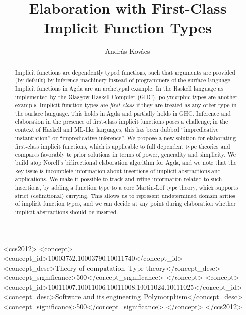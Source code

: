 \documentclass[acmsmall,screen,dvipsnames]{acmart}\settopmatter{}
\theoremstyle{remark}
\begin{document}
\title{Elaboration with First-Class Implicit Function Types}

\author{Andr{\'a}s Kov{\'a}cs}


\begin{abstract}
Implicit functions are dependently typed functions, such that arguments are
provided (by default) by inference machinery instead of programmers of the
surface language. Implicit functions in Agda are an archetypal example. In the
Haskell language as implemented by the Glasgow Haskell Compiler (GHC),
polymorphic types are another example. Implicit function types are
\emph{first-class} if they are treated as any other type in the surface
language. This holds in Agda and partially holds in GHC. Inference and
elaboration in the presence of first-class implicit functions poses a challenge;
in the context of Haskell and ML-like languages, this has been dubbed
``impredicative instantiation'' or ``impredicative inference''. We propose a new
solution for elaborating first-class implicit functions, which is applicable
to full dependent type theories and compares favorably to prior solutions in
terms of power, generality and simplicity. We build atop Norell's
bidirectional elaboration algorithm for Agda, and we note that the key issue is
incomplete information about insertions of implicit abstractions and
applications. We make it possible to track and refine information related to
such insertions, by adding a function type to a core Martin-L\"of type theory,
which supports strict (definitional) currying. This allows us to represent
undetermined domain arities of implicit function types, and we can decide at any
point during elaboration whether implicit abstractions should be inserted.
\end{abstract}


\begin{CCSXML}
<ccs2012>
<concept>
<concept_id>10003752.10003790.10011740</concept_id>
<concept_desc>Theory of computation~Type theory</concept_desc>
<concept_significance>500</concept_significance>
</concept>
<concept>
<concept_id>10011007.10011006.10011008.10011024.10011025</concept_id>
<concept_desc>Software and its engineering~Polymorphism</concept_desc>
<concept_significance>500</concept_significance>
</concept>
</ccs2012>
\end{CCSXML}
\end{document}
